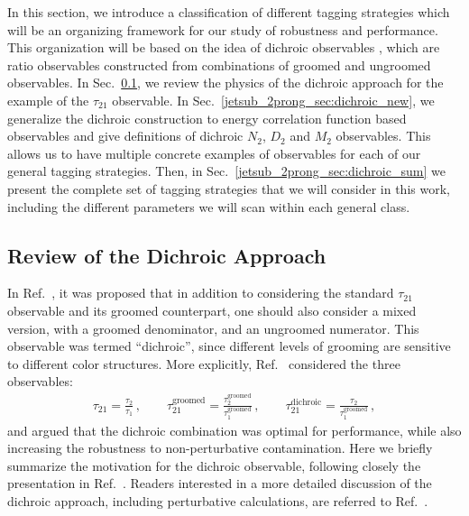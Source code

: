 \documentclass[11pt,letterpaper]{article}
\begin{document}
In this section, we introduce a classification of different tagging strategies which will be an organizing framework for our study of robustness and performance.
%
This organization will be based on the idea of dichroic observables \cite{Salam:2016yht}, which are ratio observables constructed from combinations of groomed and ungroomed observables.
%
In Sec.~\ref{jetsub_2prong_sec:dichroic}, we review the physics of the dichroic approach for the example of the $\tau_{21}$ observable.
%
In Sec.~\ref{jetsub_2prong_sec:dichroic_new}, we generalize the dichroic construction to energy correlation function based observables and give definitions of dichroic $N_2$, $D_2$ and $M_2$ observables.
%
This allows us to have multiple concrete examples of observables for each of our general tagging strategies.
%
Then, in Sec.~\ref{jetsub_2prong_sec:dichroic_sum} we present the complete set of tagging strategies that we will consider in this work, including the different parameters we will scan within each general class.



\subsection{Review of the Dichroic Approach}\label{jetsub_2prong_sec:dichroic}


In Ref.~\cite{Salam:2016yht}, it was proposed that in addition to considering the standard $\tau_{21}$ observable and its groomed counterpart, one should also consider a mixed version, with a groomed denominator, and an ungroomed numerator.
%
This observable was termed ``dichroic'', since different levels of grooming are sensitive to different color structures.
%
More explicitly, Ref.~\cite{Salam:2016yht} considered the three observables:
%
\begin{align}
 \tau_{21} =\frac{\tau_2}{\tau_1}  \,, \qquad \tau_{21}^{\text{groomed}} =\frac{\tau_2^\text{groomed}}{\tau_1^\text{groomed}}\,, \qquad \tau_{21}^{\text{dichroic}} =\frac{\tau_2}{\tau_1^\text{groomed}}\,,
\end{align}
%
and argued that the dichroic combination was optimal for performance, while also increasing the robustness to non-perturbative contamination.
%
Here we briefly summarize the motivation for the dichroic observable, following closely the presentation in Ref.~\cite{Salam:2016yht}. 
%
Readers interested in a more detailed discussion of the dichroic approach, including perturbative calculations, are referred to Ref.~\cite{Salam:2016yht}.
\end{document}
